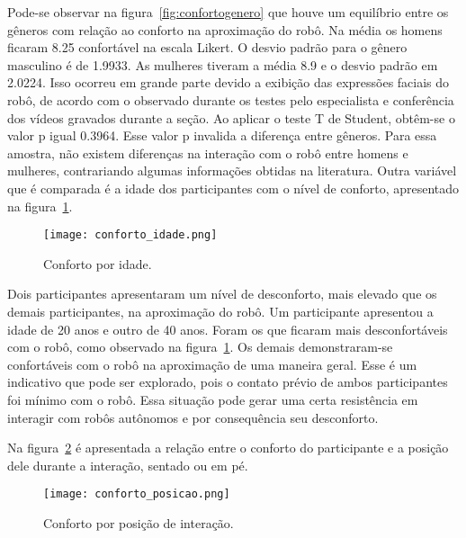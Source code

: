 Pode-se observar na figura~\ref{fig:confortogenero} que houve um equilíbrio entre os gêneros com relação ao conforto na aproximação do robô. Na média os homens ficaram 8.25 confortável na escala Likert. O desvio padrão para o gênero masculino é de 1.9933. As mulheres tiveram a média 8.9 e o desvio padrão em 2.0224. Isso ocorreu em grande parte devido a exibição das expressões faciais do robô, de acordo com o observado durante os testes pelo especialista e conferência dos vídeos gravados durante a seção. Ao aplicar o teste T de Student, obtêm-se o valor p igual 0.3964. Esse valor p invalida a diferença entre gêneros. Para essa amostra, não existem diferenças na interação com o robô entre homens e mulheres, contrariando algumas informações obtidas na literatura. Outra variável que é comparada é a idade dos participantes com o nível de conforto, apresentado na figura~\ref{fig:confortoidade}.

\begin{figure}[ht!]
	\centering
	\begin{minipage}{0.65\textwidth}
		\caption{Conforto por idade.}
		\texttt{[image: conforto\_idade.png]}
		\label{fig:confortoidade}
	\end{minipage}
\end{figure}

Dois participantes apresentaram um nível de desconforto, mais elevado que os demais participantes, na aproximação do robô. Um participante apresentou a idade de 20 anos e outro de 40 anos. Foram os que ficaram mais desconfortáveis com o robô, como observado na figura~\ref{fig:confortoidade}. Os demais demonstraram-se confortáveis com o robô na aproximação de uma maneira geral. Esse é um indicativo que pode ser explorado, pois o contato prévio de ambos participantes foi mínimo com o robô. Essa situação pode gerar uma certa resistência em interagir com robôs autônomos e por consequência seu desconforto.

Na figura~\ref{fig:confortoposicao} é apresentada a relação entre o conforto do participante e a posição dele durante a interação, sentado ou em pé.

\begin{figure}[ht!]
	\centering
	\begin{minipage}{0.65\textwidth}
		\caption{Conforto por posição de interação.}
		\texttt{[image: conforto\_posicao.png]}
		\label{fig:confortoposicao}
	\end{minipage}
\end{figure}

